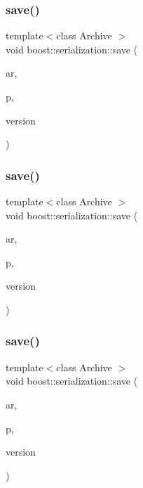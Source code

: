 \mbox{\label{namespaceboost_1_1serialization_a02839a8348cf5e4adfac1f031eb0bf02}} 
\subsubsection{\texorpdfstring{save()}{save()}\hspace{0.1cm}{\footnotesize\ttfamily [3/6]}}
{\footnotesize\ttfamily template$<$class Archive $>$ \\
void boost\+::serialization\+::save (\begin{DoxyParamCaption}\item[{Archive \&}]{ar,  }\item[{const N\+T\+L\+::\+Z\+ZX \&}]{p,  }\item[{const unsigned int}]{version }\end{DoxyParamCaption})}

\mbox{\label{namespaceboost_1_1serialization_a58966b07928230bb0400b6117217baa1}} 
\subsubsection{\texorpdfstring{save()}{save()}\hspace{0.1cm}{\footnotesize\ttfamily [4/6]}}
{\footnotesize\ttfamily template$<$class Archive $>$ \\
void boost\+::serialization\+::save (\begin{DoxyParamCaption}\item[{Archive \&}]{ar,  }\item[{const N\+T\+L\+::vec\+\_\+\+ZZ \&}]{p,  }\item[{const unsigned int}]{version }\end{DoxyParamCaption})}

\mbox{\label{namespaceboost_1_1serialization_acd0cd0062652d786e7d0d108a7844d1c}} 
\subsubsection{\texorpdfstring{save()}{save()}\hspace{0.1cm}{\footnotesize\ttfamily [5/6]}}
{\footnotesize\ttfamily template$<$class Archive $>$ \\
void boost\+::serialization\+::save (\begin{DoxyParamCaption}\item[{Archive \&}]{ar,  }\item[{const N\+T\+L\+::vec\+\_\+\+Z\+Z\+\_\+p \&}]{p,  }\item[{const unsigned int}]{version }\end{DoxyParamCaption})}


